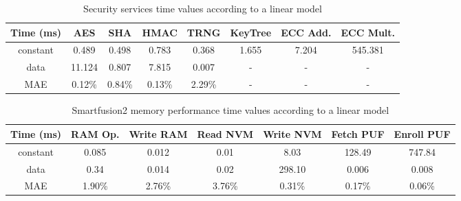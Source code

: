 \begin{table}[h!]
\centering
\def\arraystretch{1.5}
\begin{tabular}{|c|c|c|c|c|c|c|c|}
\hline
	Time (ms) & AES    & SHA    & HMAC   & TRNG   & KeyTree & ECC Add. & ECC Mult.   \\ \hline
	constant  & 0.489  & 0.498 & 0.783  & 0.368  & 1.655   & 7.204 & 545.381 \\ \hline
	data      & 11.124 & 0.807  & 7.815  & 0.007  & -       & -  & - \\ \hline
	MAE       & 0.12\% & 0.84\% & 0.13\% & 2.29\% & -       & -  & - \\ \hline
\end{tabular}
\caption{Security services time values according to a linear model}
\label{tab:core-model}
\end{table}

\begin{table}[h!]
\centering
\def\arraystretch{1.5}
\begin{tabular}{|c|c|c|c|c|c|c|}
\hline
Time (ms) & RAM Op. & Write RAM & Read NVM & Write NVM & Fetch PUF & Enroll PUF \\ \hline
constant  & 0.085     & 0.012     & 0.01     & 8.03      & 128.49    & 747.84  \\ \hline
data      & 0.34     & 0.014     & 0.02     & 298.10    & 0.006     & 0.008  \\ \hline
MAE       & 1.90\%    & 2.76\%    & 3.76\%   & 0.31\%    & 0.17\%    & 0.06\%  \\ \hline
\end{tabular}
\caption{Smartfusion2 memory performance time values according to a linear model}
\label{tab:core-model}
\end{table}
